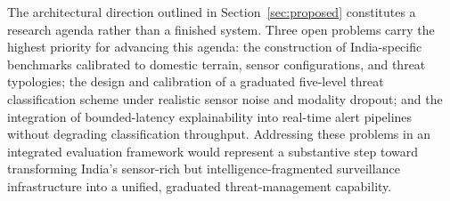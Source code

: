 The architectural direction outlined in Section~\ref{sec:proposed} constitutes a research agenda rather than a finished system. Three open problems carry the highest priority for advancing this agenda: the construction of India-specific benchmarks calibrated to domestic terrain, sensor configurations, and threat typologies; the design and calibration of a graduated five-level threat classification scheme under realistic sensor noise and modality dropout; and the integration of bounded-latency explainability into real-time alert pipelines without degrading classification throughput. Addressing these problems in an integrated evaluation framework would represent a substantive step toward transforming India's sensor-rich but intelligence-fragmented surveillance infrastructure into a unified, graduated threat-management capability.
